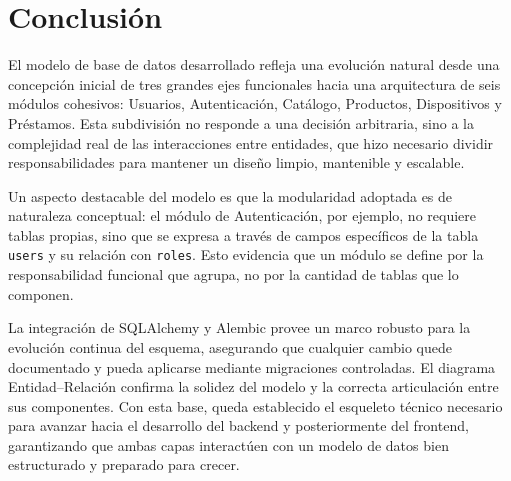 \section{Conclusión}

El modelo de base de datos desarrollado refleja una evolución natural desde una 
concepción inicial de tres grandes ejes funcionales hacia una arquitectura de seis 
módulos cohesivos: Usuarios, Autenticación, Catálogo, Productos, Dispositivos y 
Préstamos. Esta subdivisión no responde a una decisión arbitraria, sino a la 
complejidad real de las interacciones entre entidades, que hizo necesario dividir 
responsabilidades para mantener un diseño limpio, mantenible y escalable.

Un aspecto destacable del modelo es que la modularidad adoptada es de naturaleza 
conceptual: el módulo de Autenticación, por ejemplo, no requiere tablas propias, 
sino que se expresa a través de campos específicos de la tabla \texttt{users} y su 
relación con \texttt{roles}. Esto evidencia que un módulo se define por la 
responsabilidad funcional que agrupa, no por la cantidad de tablas que lo componen.

La integración de SQLAlchemy y Alembic provee un marco robusto para la evolución 
continua del esquema, asegurando que cualquier cambio quede documentado y pueda 
aplicarse mediante migraciones controladas. El diagrama Entidad–Relación confirma 
la solidez del modelo y la correcta articulación entre sus componentes. Con esta 
base, queda establecido el esqueleto técnico necesario para avanzar hacia el 
desarrollo del backend y posteriormente del frontend, garantizando que ambas capas 
interactúen con un modelo de datos bien estructurado y preparado para crecer.